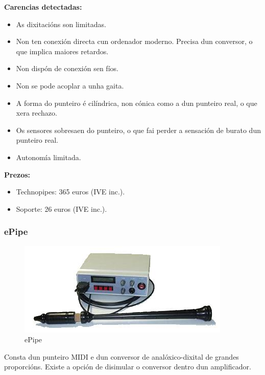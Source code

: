   \textbf{Carencias detectadas:}

  \begin{itemize}
   \item As dixitacións son limitadas.
   \item Non ten conexión directa cun ordenador moderno. Precisa dun conversor,
         o que implica maiores retardos.
   \item Non dispón de conexión sen fíos.
   \item Non se pode acoplar a unha gaita.
   \item A forma do punteiro é cilíndrica, non cónica como a dun punteiro real,
         o que xera rechazo.
   \item Os sensores sobresaen do punteiro, o que fai perder a sensación de
         burato dun punteiro real.
   \item Autonomía limitada.
  \end{itemize}

  \textbf{Prezos:}

  \begin{itemize}
   \item Technopipes: 365 euros (IVE inc.).
   \item Soporte: 26 euros (IVE inc.).
  \end{itemize}

  \subsubsection{ePipe}

  \begin{figure}[htbp]
   \centering
   \includegraphics[scale=0.9,keepaspectratio=true]{./imagenes/epipe.jpg}
   \caption[ePipe]{ePipe \cite{ePipe}}
   \label{figura:ePipe}
  \end{figure}

  Consta dun punteiro MIDI e dun conversor de analóxico-dixital de grandes
  proporcións. Existe a opción de disimular o conversor dentro dun
  amplificador. \\

